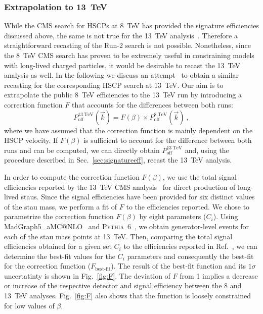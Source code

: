 \subsubsection{Extrapolation to 13~TeV} \label{sec:extra}

While the CMS search for HSCPs at 8~TeV has provided the
signature efficiencies discussed above, the same is not true for
the 13~TeV analysis~\cite{CMS-PAS-EXO-16-036}.
Therefore a straightforward recasting of the Run-2 search is not possible.
Nonetheless, since the 8~TeV CMS search has proven to be extremely useful
in constraining models with long-lived charged particles,
it would be desirable to recast the 13~TeV analysis as well.
In the following we discuss an attempt~\cite{LesHouches2017}
to obtain a similar recasting for the corresponding HSCP search at 13~TeV.
Our aim is to extrapolate the public 8~TeV efficiencies to the 13~TeV run by
introducing a correction function $F$ that accounts for the differences between both runs:
\begin{equation}
\label{eq:introF}
P^{13~\text{TeV}}_{\text{off}}(\vec{k}) = F(\beta) \times
P^{8~\text{TeV}}_{\text{off}}(\vec{k})~,
\end{equation}
where we have assumed that the correction function is mainly dependent on the
HSCP velocity. If $F(\beta)$ is sufficient to account for the difference
between both runs and can be computed, we can directly obtain
$P^{13~\text{TeV}}_{\text{off}}$ and, using the procedure described in
Sec.~\ref{sec:signatureeff}, recast the 13~TeV analysis.

In order to compute the correction function $F(\beta)$, we use
the total signal efficiencies reported by the
13~TeV CMS analysis~\cite{CMS-PAS-EXO-16-036} for
direct production of long-lived staus.
Since the signal efficiencies have been provided for six distinct
values of the stau mass, we perform a fit of $F$ to the efficiencies reported.
We chose to parametrize the correction function $F(\beta)$ by eight parameters
($C_{i}$).
Using {\sc MadGraph5\_aMC@NLO}~\cite{Alwall:2014hca}
and \textsc{Pythia}~6~\cite{Sjostrand:2006za}, we obtain generator-level events
for each of the stau mass points at 13~TeV.
Then, comparing the total signal efficiencies obtained for a given set $C_{i}$
to the efficiencies reported in Ref.~\cite{CMS-PAS-EXO-16-036}, we can determine
the best-fit values for the $C_{i}$ parameters and consequently the
best-fit for the correction function ($F_\text{best-fit}$).
The result of the best-fit function and its $1\sigma$ uncertatinty is shown in
Fig.~\ref{fig:F}. The deviation of $F$ from 1 implies a decrease or increase
of the respective detector and signal efficiency between the 8 and 13~TeV
analyses. Fig.~\ref{fig:F} also shows that the function is loosely constrained
for low values of $\beta$.

